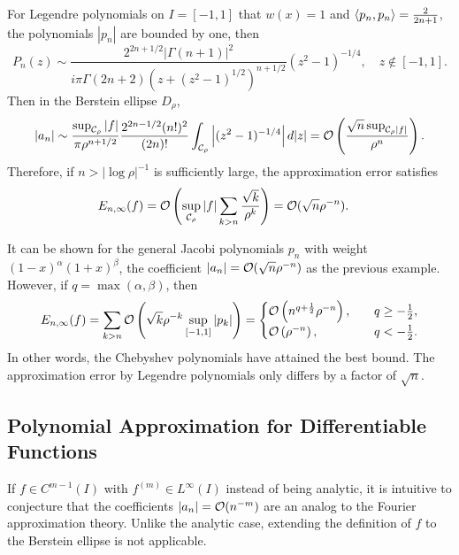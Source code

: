 \begin{example}
    For Legendre polynomials on $I = [-1, 1]$ that $w(x) = 1$ and $\langle {p_n, p_n} \rangle = \frac{2}{2n+1}$, the polynomials $|p_n|$ are bounded by one, then 
    \begin{equation}
        P_n(z) \sim \frac{2^{2n+1/2}|\Gamma(n+1)|^2}{i\pi \Gamma(2n+2)(z+(z^2-1)^{1/2})^{n+1/2}} (z^2-1)^{-1/4},\quad z\notin [-1,1].
    \end{equation}
    Then in the Berstein ellipse $D_{\rho}$, 
    \begin{equation}
        |a_n|\sim \frac{\sup_{\mathcal C_{\rho}}|f|}{\pi \rho^{n + 1/2} } \frac{2^{2n-1/2}(n!)^2 }{ (2n)!  }\int_{\mathcal C_{\rho}} \left|(z^2 - 1)^{-1/4}\right| d|z| = \mathcal O\left(\frac{\sqrt{ n}\sup_{\mathcal C_{\rho}|f|}}{\rho^n}\right).
    \end{equation}
    Therefore, if $n > |\log \rho|^{-1}$ is sufficiently large, the approximation error satisfies
    \begin{equation}
    \begin{aligned}
        E_{n,\infty}(f) &= \mathcal O\left(\sup_{\mathcal C_{\rho} } |f| \sum_{k>n}\frac{\sqrt{k}}{\rho^k}\right) = \mathcal O(\sqrt{n}\rho^{-n}).
    \end{aligned}
    \end{equation}
\end{example}
\begin{remark}
    It can be shown for the general Jacobi polynomials $p_n$ with weight $(1-x)^{\alpha}(1+x)^{\beta}$, the coefficient 
    $|a_n| = \mathcal O(\sqrt{n} \rho^{-n} )$ as the previous example. However, if $q = \max(\alpha, \beta)$, then 
    \begin{equation}
        E_{n,\infty}(f) = \sum_{k>n} \mathcal O\left(\sqrt{k} \rho^{-k} \sup_{[-1,1]} |p_k|\right) = \begin{cases}
            \mathcal O\left( n^{q+\frac{1}{2}}\rho^{-n}\right),\quad & q\ge -\frac{1}{2},        \\
             \mathcal O\left( \rho^{-n} \right),\quad & q < -\frac{1}{2}. 
            \end{cases}
    \end{equation}
    In other words, the Chebyshev polynomials have attained the best bound. The approximation error by Legendre polynomials only differs by a factor of $\sqrt{n}$. 
\end{remark}
\subsection{Polynomial Approximation for Differentiable Functions}
If $f\in C^{m-1}(I)$ with $f^{(m)}\in L^{\infty}(I)$ instead of being analytic, it is intuitive to conjecture that the coefficients $|a_n| = \mathcal O(n^{-m})$ are an analog to the Fourier approximation theory. Unlike the analytic case, extending the definition of $f$ to the Berstein ellipse is not applicable. 

